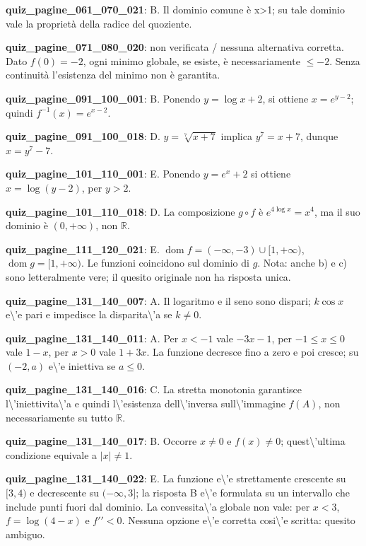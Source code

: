 \documentclass[11pt,a4paper]{article}
\newcounter{quiz}
\begin{document}
\noindent\textbf{quiz\_pagine\_061\_070\_021}: B. Il dominio comune è x>1; su tale dominio vale la proprietà della radice del quoziente.\par\medskip
\noindent\textbf{quiz\_pagine\_071\_080\_020}: non verificata / nessuna alternativa corretta. Dato $f(0)=-2$, ogni minimo globale, se esiste, è necessariamente $\le-2$. Senza continuità l'esistenza del minimo non è garantita.\par\medskip
\noindent\textbf{quiz\_pagine\_091\_100\_001}: B. Ponendo $y=\log x+2$, si ottiene $x=e^{y-2}$; quindi $f^{-1}(x)=e^{x-2}$.\par\medskip
\noindent\textbf{quiz\_pagine\_091\_100\_018}: D. $y=\sqrt[7]{x+7}$ implica $y^7=x+7$, dunque $x=y^7-7$.\par\medskip
\noindent\textbf{quiz\_pagine\_101\_110\_001}: E. Ponendo $y=e^x+2$ si ottiene $x=\log(y-2)$, per $y>2$.\par\medskip
\noindent\textbf{quiz\_pagine\_101\_110\_018}: D. La composizione $g\circ f$ è $e^{4\log x}=x^4$, ma il suo dominio è $(0,+\infty)$, non $\mathbb R$.\par\medskip
\noindent\textbf{quiz\_pagine\_111\_120\_021}: E. $\operatorname{dom}f=(-\infty,-3)\cup[1,+\infty)$, $\operatorname{dom}g=[1,+\infty)$. Le funzioni coincidono sul dominio di $g$. Nota: anche b) e c) sono letteralmente vere; il quesito originale non ha risposta unica.\par\medskip
\noindent\textbf{quiz\_pagine\_131\_140\_007}: A. Il logaritmo e il seno sono dispari; $k\cos x$ e\textbackslash{}'e pari e impedisce la disparita\textbackslash{}'a se $k\neq0$.\par\medskip
\noindent\textbf{quiz\_pagine\_131\_140\_011}: A. Per $x<-1$ vale $-3x-1$, per $-1\le x\le0$ vale $1-x$, per $x>0$ vale $1+3x$. La funzione decresce fino a zero e poi cresce; su $(-2,a)$ e\textbackslash{}'e iniettiva se $a\le0$.\par\medskip
\noindent\textbf{quiz\_pagine\_131\_140\_016}: C. La stretta monotonia garantisce l\textbackslash{}'iniettivita\textbackslash{}'a e quindi l\textbackslash{}'esistenza dell\textbackslash{}'inversa sull\textbackslash{}'immagine $f(A)$, non necessariamente su tutto $\mathbb R$.\par\medskip
\noindent\textbf{quiz\_pagine\_131\_140\_017}: B. Occorre $x\neq0$ e $f(x)\neq0$; quest\textbackslash{}'ultima condizione equivale a $|x|\neq1$.\par\medskip
\noindent\textbf{quiz\_pagine\_131\_140\_022}: E. La funzione e\textbackslash{}'e strettamente crescente su $[3,4)$ e decrescente su $(-\infty,3]$; la risposta B e\textbackslash{}'e formulata su un intervallo che include punti fuori dal dominio. La convessita\textbackslash{}'a globale non vale: per $x<3$, $f=\log(4-x)$ e $f\prime\prime<0$. Nessuna opzione e\textbackslash{}'e corretta cosi\textbackslash{}'e scritta: quesito ambiguo.\par\medskip
\end{document}
